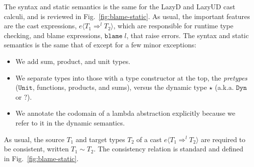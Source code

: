 \documentclass[acmsmall,review,anonymous]{acmart}\settopmatter{printfolios=true,printccs=false,printacmref=false}
\newcommand{\figref}[1]{Fig.~\ref{#1}}
\newcommand{\lazyUD}{Lazy\;UD}
\newcommand{\lazyD}{Lazy\;D}
\newcommand{\POOunit}[0]{\mathtt{Unit}}
\newcommand{\eOOcast}[4]{#1 \langle \cOOcast{#2}{#3}{#4} \rangle}
\newcommand{\eOOblame}[1]{\mathtt{blame} \; #1}
\newcommand{\cOOcast}[3]{#1 \Rightarrow^{#2} #3}
\begin{document}
The syntax and static semantics is the same for the \lazyD{} and
\lazyUD{} cast calculi, and is reviewed in \figref{fig:blame-static}.
As usual, the important features are the cast expressions,
$\eOOcast{e}{T_1}{l}{T_2}$, which are responsible for runtime type
checking, and blame expressions, $\eOOblame{l}$, that raise errors.
The syntax and static semantics is the same that of
\citet{siek2009exploring} except for a few minor exceptions:
\begin{itemize}
\item We add sum, product, and unit types.
\item We separate types into those with a type constructor at the top,
  the \emph{pretypes} ($\POOunit$, functions, products, and sums),
  versus the dynamic type $\star$ (a.k.a. $\mathtt{Dyn}$ or
  $\mathbb{?}$).
\item We annotate the codomain of a lambda abstraction explicitly
  because we refer to it in the dynamic semantics. 
\end{itemize}
As usual, the source $T_1$ and target types $T_2$ of a cast
$\eOOcast{e}{T_1}{l}{T_2}$ are required to be consistent, written $T_1
\sim T_2$. The consistency relation is standard and defined in
\figref{fig:blame-static}.




\end{document}
